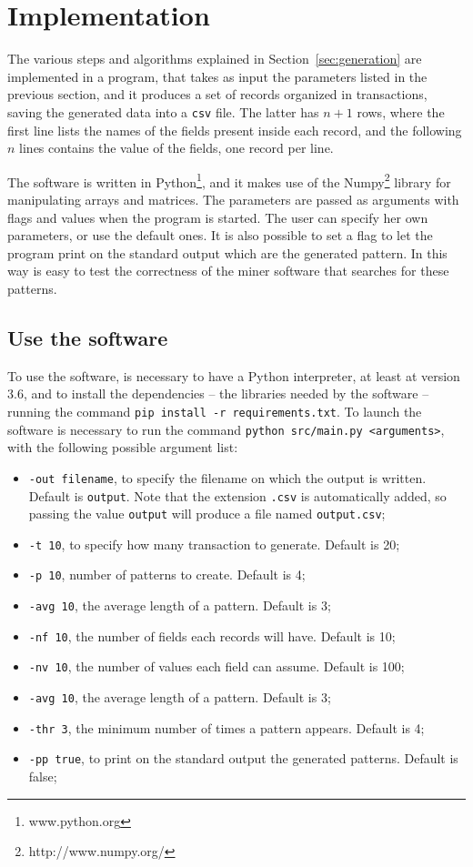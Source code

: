 \documentclass{acm_proc_article-sp-sigmod09}
\begin{document}
\section{Implementation}
The various steps and algorithms explained in Section~\ref{sec:generation} are implemented in a program, that takes as input the parameters listed in the previous section, and it produces a set of records organized in transactions, saving the generated data into a \texttt{csv} file. The latter has $n + 1$ rows, where the first line lists the names of the fields present inside each record, and the following $n$ lines contains the value of the fields, one record per line.

The software is written in Python\footnote{www.python.org}, and it makes use of the Numpy\footnote{http://www.numpy.org/} library \cite{oliphant2006guide} for manipulating arrays and matrices. The parameters are passed as arguments with flags and values when the program is started. The user can specify her own parameters, or use the default ones. It is also possible to set a flag to let the program print on the standard output which are the generated pattern. In this way is easy to test the correctness of the miner software that searches for these patterns.

\subsection{Use the software}
To use the software, is necessary to have a Python interpreter, at least at version 3.6, and to install the dependencies -- the libraries needed by the software -- running the command \texttt{pip install -r requirements.txt}. To launch the software is necessary to run the command \texttt{python src/main.py <arguments>}, with the following possible argument list:
\begin{itemize}
\item \texttt{-out filename}, to specify the filename on which the output is written. Default is \texttt{output}. Note that the extension \texttt{.csv} is automatically added, so passing the value \texttt{output} will produce a file named \texttt{output.csv};
\item \texttt{-t 10}, to specify how many transaction to generate. Default is 20;
\item \texttt{-p 10}, number of patterns to create. Default is 4;
\item \texttt{-avg 10}, the average length of a pattern. Default is 3;
\item \texttt{-nf 10}, the number of fields each records will have. Default is 10;
\item \texttt{-nv 10}, the number of values each field can assume. Default is 100;
\item \texttt{-avg 10}, the average length of a pattern. Default is 3;
\item \texttt{-thr 3}, the minimum number of times a pattern appears. Default is 4;
\item \texttt{-pp true}, to print on the standard output the generated patterns. Default is false;
\end{itemize}
\end{document}
